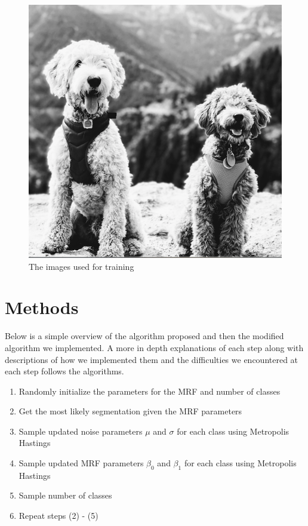 \documentclass[11pt]{article}
\begin{document}
\begin{figure}[!htb]
\begin{center}
\begin{multicols}{4}
	\includegraphics[height = \linewidth]{targetpractice}\par
\end{multicols}
\caption{The images used for training}
\end{center}
\end{figure}

\section{Methods}
Below is a simple overview of the algorithm proposed and then the modified algorithm we implemented.
A more in depth explanations of each step along with descriptions of how we implemented them and the difficulties we encountered at each step follows the algorithms.

\begin{enumerate}
	\item Randomly initialize the parameters for the MRF and number of classes
	\item Get the most likely segmentation given the MRF parameters
	\item Sample updated noise parameters $\mu$ and $\sigma$ for each class using Metropolis Hastings
	\item Sample updated MRF parameters $\beta_0$ and $\beta_1$ for each class using Metropolis Hastings
	\item Sample number of classes
	\item Repeat steps (2) - (5)
\end{enumerate}
\end{document}
